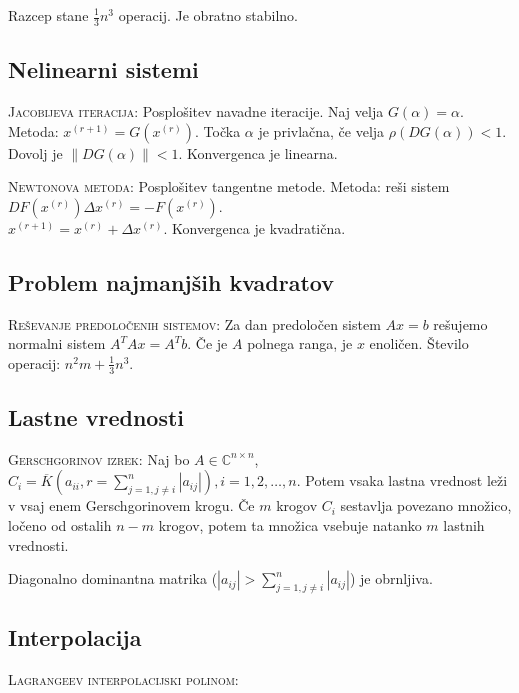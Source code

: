 \documentclass[a4paper,10pt]{article}
\theoremstyle{definition}
\def\C{\mathbb{C}}
\begin{document}
Razcep stane $\frac13n^3$ operacij. Je obratno stabilno.

\subsection*{Nelinearni sistemi}

\textsc{Jacobijeva iteracija:}
Posplošitev navadne iteracije. Naj velja $G(\alpha)= \alpha$. Metoda: $x^{(r+1)}
= G(x^{(r)})$. Točka $\alpha$ je privlačna, če velja $\rho(DG(\alpha)) < 1$.
Dovolj je $\|DG(\alpha)\| < 1$.  Konvergenca je linearna.

\textsc{Newtonova metoda:}
Posplošitev tangentne metode. Metoda: reši sistem $DF(x^{(r)})\Delta x^{(r)} =
-F(x^{(r)})$. \\ $x^{(r+1)} = x^{(r)} + \Delta x^{(r)}$. Konvergenca je
kvadratična.

\subsection*{Problem najmanjših kvadratov}

\textsc{Reševanje predoločenih sistemov:} Za dan predoločen sistem $Ax=b$
rešujemo normalni sistem $A^TAx=A^Tb$. Če je $A$ polnega ranga, je $x$ enoličen.
Število operacij: $n^2m + \frac13n^3$.


\subsection*{Lastne vrednosti}

\textsc{Gerschgorinov izrek:} Naj bo $A \in \C ^{n\times n}$, $C_i =
\overline{K}(a_{ii}, r=\sum_{j=1, j \neq i}^n | a_{ij}|), i=1,2,\ldots ,n$.
Potem vsaka lastna vrednost leži v vsaj enem Gerschgorinovem krogu. Če $m$
krogov $C_i$ sestavlja povezano množico, ločeno od ostalih $n-m$ krogov, potem
ta množica vsebuje natanko $m$ lastnih vrednosti.

Diagonalno dominantna matrika ($|a_{ij}| > \sum_{j=1, j\neq i}^n|a_{ij}|$) je obrnljiva.

\subsection*{Interpolacija}

\textsc{Lagrangeev interpolacijski polinom:}
\end{document}

